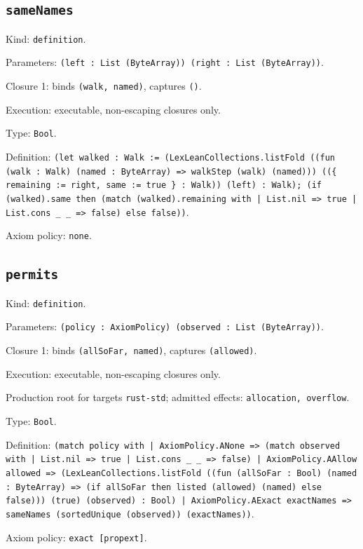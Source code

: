 \documentclass[11pt]{article}
\begin{document}
\subsection*{\texttt{sameNames}}
\noindent Kind: \texttt{definition}.\par
\noindent Parameters: \texttt{(left : List (ByteArray)) (right : List (ByteArray))}.\par
\noindent Closure 1: binds \texttt{(walk, named)}, captures \texttt{()}.\par
\noindent Execution: executable, non-escaping closures only.\par
\noindent Type: \texttt{Bool}.\par
\noindent Definition: \texttt{(let walked : Walk := (LexLeanCollections.listFold ((fun (walk : Walk) (named : ByteArray) => walkStep (walk) (named))) ((\{ remaining := right, same := true \} : Walk)) (left) : Walk); (if (walked).same then (match (walked).remaining with | List.nil => true | List.cons \_ \_ => false) else false))}.\par
\noindent Axiom policy: \texttt{none}.\par
\subsection*{\texttt{permits}}
\noindent Kind: \texttt{definition}.\par
\noindent Parameters: \texttt{(policy : AxiomPolicy) (observed : List (ByteArray))}.\par
\noindent Closure 1: binds \texttt{(allSoFar, named)}, captures \texttt{(allowed)}.\par
\noindent Execution: executable, non-escaping closures only.\par
\noindent Production root for targets \texttt{rust-std}; admitted effects: \texttt{allocation, overflow}.\par
\noindent Type: \texttt{Bool}.\par
\noindent Definition: \texttt{(match policy with | AxiomPolicy.ANone => (match observed with | List.nil => true | List.cons \_ \_ => false) | AxiomPolicy.AAllow allowed => (LexLeanCollections.listFold ((fun (allSoFar : Bool) (named : ByteArray) => (if allSoFar then listed (allowed) (named) else false))) (true) (observed) : Bool) | AxiomPolicy.AExact exactNames => sameNames (sortedUnique (observed)) (exactNames))}.\par
\noindent Axiom policy: \texttt{exact [propext]}.\par
\end{document}
